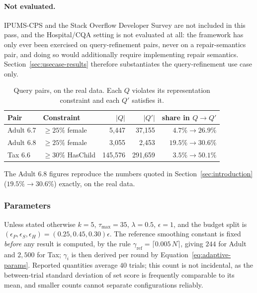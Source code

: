 \paragraph{Not evaluated.}
IPUMS-CPS and the Stack Overflow Developer Survey are not included in this pass, and the Hospital/CQA setting is not evaluated at all: the framework has only ever been exercised on query-refinement pairs, never on a repair-semantics pair, and doing so would additionally require implementing repair semantics.
Section~\ref{sec:usecase-results} therefore substantiates the query-refinement use case only.

\begin{table}[t]
\centering
\small
\caption{Query pairs, on the real data. Each $Q$ violates its representation constraint and each $Q'$ satisfies it.}
\label{tab:query-pairs}
\begin{tabular}{@{}llrrr@{}}
\toprule
Pair & Constraint & $|Q|$ & $|Q'|$ & share in $Q\rightarrow Q'$ \\
\midrule
Adult 6.7  & $\ge25\%$ female   & 5{,}447  & 37{,}155  & $4.7\%\rightarrow26.9\%$ \\
Adult 6.8  & $\ge25\%$ female   & 3{,}055  & 2{,}453   & $19.5\%\rightarrow30.6\%$ \\
Tax 6.6    & $\ge30\%$ HasChild & 145{,}576 & 291{,}659 & $3.5\%\rightarrow50.1\%$ \\
\bottomrule
\end{tabular}
\end{table}

The Adult 6.8 figures reproduce the numbers quoted in Section~\ref{sec:introduction} ($19.5\%\rightarrow30.6\%$) exactly, on the real data.

\subsubsection{Parameters}
\label{subsubsec:parameters}

Unless stated otherwise $k=5$, $\tau_{\max}=35$, $\lambda=0.5$, $\epsilon=1$, and the budget split is $(\epsilon_P,\epsilon_S,\epsilon_H)=(0.25,0.45,0.30)\epsilon$.
The reference smoothing constant is fixed \emph{before} any result is computed, by the rule $\gamma_{\text{ref}}=\lceil 0.005\,N\rceil$, giving $244$ for Adult and $2{,}500$ for Tax; $\gamma_i$ is then derived per round by Equation~\eqref{eq:adaptive-params}.
Reported quantities average $40$ trials; this count is not incidental, as the between-trial standard deviation of set score is frequently comparable to its mean, and smaller counts cannot separate configurations reliably.

